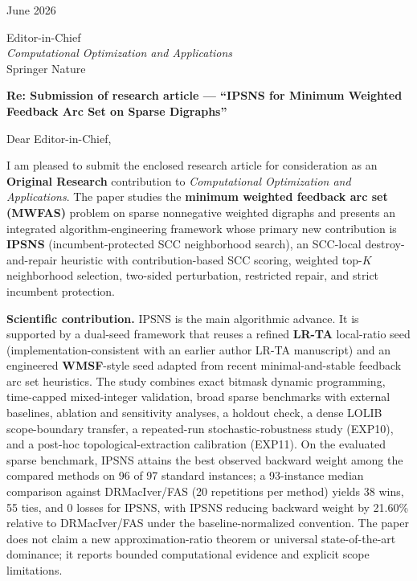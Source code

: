 \documentclass[11pt]{article}
\begin{document}
 June 2026

\vspace{0.75em}
\noindent
Editor-in-Chief\\
\textit{Computational Optimization and Applications}\\
Springer Nature

\vspace{0.75em}
\noindent
\textbf{Re: Submission of research article --- ``IPSNS for Minimum Weighted Feedback Arc Set on Sparse Digraphs''}

\vspace{0.75em}
Dear Editor-in-Chief,

I am pleased to submit the enclosed research article for consideration as an \textbf{Original Research} contribution to \textit{Computational Optimization and Applications}. The paper studies the \textbf{minimum weighted feedback arc set (MWFAS)} problem on sparse nonnegative weighted digraphs and presents an integrated algorithm-engineering framework whose primary new contribution is \textbf{IPSNS} (incumbent-protected SCC neighborhood search), an SCC-local destroy-and-repair heuristic with contribution-based SCC scoring, weighted top-$K$ neighborhood selection, two-sided perturbation, restricted repair, and strict incumbent protection.

\textbf{Scientific contribution.} IPSNS is the main algorithmic advance. It is supported by a dual-seed framework that reuses a refined \textbf{LR-TA} local-ratio seed (implementation-consistent with an earlier author LR-TA manuscript) and an engineered \textbf{WMSF}-style seed adapted from recent minimal-and-stable feedback arc set heuristics. The study combines exact bitmask dynamic programming, time-capped mixed-integer validation, broad sparse benchmarks with external baselines, ablation and sensitivity analyses, a holdout check, a dense LOLIB scope-boundary transfer, a repeated-run stochastic-robustness study (EXP10), and a post-hoc topological-extraction calibration (EXP11). On the evaluated sparse benchmark, IPSNS attains the best observed backward weight among the compared methods on 96 of 97 standard instances; a 93-instance median comparison against DRMacIver/FAS (20 repetitions per method) yields 38 wins, 55 ties, and 0 losses for IPSNS, with IPSNS reducing backward weight by 21.60\% relative to DRMacIver/FAS under the baseline-normalized convention. The paper does not claim a new approximation-ratio theorem or universal state-of-the-art dominance; it reports bounded computational evidence and explicit scope limitations.
\end{document}
